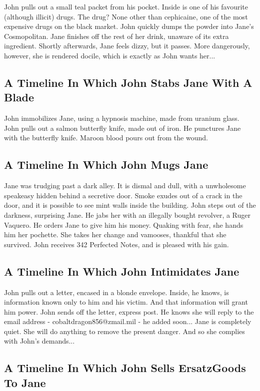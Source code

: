 \documentclass{article}
\begin{document}
John pulls out a small teal packet from his pocket. Inside is one of his favourite (although illicit) drugs.
The drug? None other than cephicaine, one of the most expensive drugs on the black market.
John quickly dumps the powder into Jane's Cosmopolitan.
Jane finishes off the rest of her drink, unaware of its extra ingredient.
Shortly afterwards, Jane feels dizzy, but it passes.
More dangerously, however, she is rendered docile, which is exactly as John wants her...
\subsection{A Timeline In Which John Stabs Jane With A Blade}


John immobilizes Jane, using a hypnosis machine, made from uranium glass.
John pulls out a salmon butterfly knife, made out of iron.
He punctures Jane with the butterfly knife.
Maroon blood pours out from the wound.
\subsection{A Timeline In Which John Mugs Jane}


Jane was trudging past a dark alley.
It is dismal and dull, with a unwholesome speakeasy hidden behind a secretive door.
Smoke exudes out of a crack in the door, and it is possible to see mint walls inside the building.
John steps out of the darkness, surprising Jane.
He jabs her with an illegally bought revolver, a Ruger Vaquero.
He orders Jane to give him his money.
Quaking with fear, she hands him her pochette.
She takes her change and vamooses, thankful that she survived.
John receives 342 Perfected Notes, and is pleased with his gain.
\subsection{A Timeline In Which John Intimidates Jane}


John pulls out a letter, encased in a blonde envelope. Inside, he knows, is information known only to him and his victim. And that information will grant him power.
John sends off the letter, express post. He knows she will reply to the email address {-} cobaltdragon856@zmail.mil {-} he added soon...
Jane is completely quiet. She will do anything to remove the present danger. And so she complies with John's demands...
\subsection{A Timeline In Which John Sells ErsatzGoods To Jane}
\end{document}
